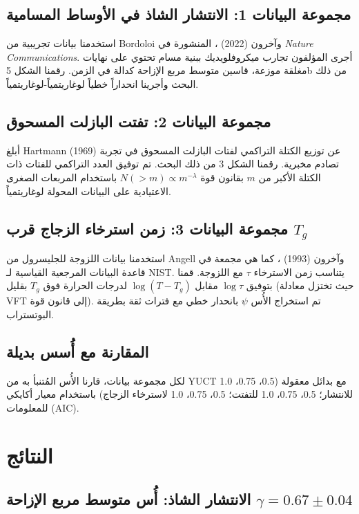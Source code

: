 \documentclass[11pt,a4paper]{article}
\begin{document}
	\subsection{مجموعة البيانات 1: الانتشار الشاذ في الأوساط المسامية}
	استخدمنا بيانات تجريبية من Bordoloi وآخرون (2022) \cite{Bordoloi2022}، المنشورة في \emph{Nature Communications}. أجرى المؤلفون تجارب ميكروفلويديك ببنية مسام تحتوي على نهايات مغلقة موزعة، قاسين متوسط مربع الإزاحة كدالة في الزمن. رقمنا الشكل 5b من ذلك البحث وأجرينا انحداراً خطياً لوغاريتمياً-لوغاريتمياً.
	
	\subsection{مجموعة البيانات 2: تفتت البازلت المسحوق}
	أبلغ Hartmann (1969) \cite{Hartmann1969} عن توزيع الكتلة التراكمي لفتات البازلت المسحوق في تجربة تصادم مخبرية. رقمنا الشكل 3 من ذلك البحث. تم توفيق العدد التراكمي للفتات ذات الكتلة الأكبر من \(m\) بقانون قوة \(N(>m) \propto m^{-\lambda}\) باستخدام المربعات الصغرى الاعتيادية على البيانات المحولة لوغاريتمياً.
	
	\subsection{مجموعة البيانات 3: زمن استرخاء الزجاج قرب \(T_g\)}
	استخدمنا بيانات اللزوجة للجليسرول من Angell وآخرون (1993) \cite{Angell1993}، كما هي مجمعة في قاعدة البيانات المرجعية القياسية لـ NIST. يتناسب زمن الاسترخاء \(\tau\) مع اللزوجة. قمنا بتوفيق \(\log \tau\) مقابل \(\log(T - T_g)\) لدرجات الحرارة فوق \(T_g\) بقليل (حيث تختزل معادلة VFT إلى قانون قوة). تم استخراج الأُس \(\psi\) بانحدار خطي مع فترات ثقة بطريقة البوتستراب.
	
	\subsection{المقارنة مع أُسس بديلة}
	لكل مجموعة بيانات، قارنا الأُس المُتنبأ به من YUCT مع بدائل معقولة (0.5، 0.75، 1.0 للانتشار؛ 0.5، 0.75، 1.0 للتفتت؛ 0.5، 0.75، 1.0 لاسترخاء الزجاج) باستخدام معيار أكايكي للمعلومات (AIC).
	
	\section{النتائج}
	
	\subsection{الانتشار الشاذ: أُس متوسط مربع الإزاحة \(\gamma = 0.67 \pm 0.04\)}
	
\end{document}
